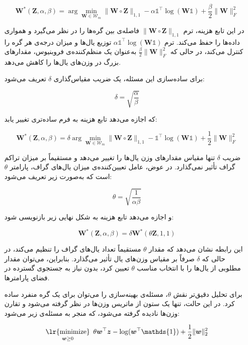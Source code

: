 \documentclass[10pt,twocolumn,a4paper]{article}
\newcommand\minimize[1]{\mathop{\text{\lr{minimize}}}\limits_{#1}\ }
\begin{document}
      \[
      \bm{W}^*(\bm{Z}, \alpha, \beta) = \arg \min_{\bm{W} \in \mathcal{W}_m} \|\bm{W} \circ \bm{Z}\|_{1,1} - \alpha \mathds{1}^\top \log(\bm{W} \mathds{1}) + \frac{\beta}{2} \|\bm{W}\|_F^2
      \]
      
      در این تابع هزینه، ترم \( \|\bm{W} \circ \bm{Z}\|_{1,1} \) فاصله‌ی بین گره‌ها را در نظر می‌گیرد و همواری داده‌ها را حفظ می‌کند. ترم \( \alpha \mathds{1}^\top \log(\bm{W} \mathds{1}) \) توزیع یال‌ها و میزان درجه‌ی هر گره را کنترل می‌کند، در حالی که \( \frac{\beta}{2} \|\bm{W}\|_F^2 \) به‌عنوان یک منظم‌کننده‌ی فروبنیوس، مقدارهای بزرگ در وزن‌های یال‌ها را کاهش می‌دهد.
      
      برای ساده‌سازی این مسئله، یک ضریب مقیاس‌گذاری \( \delta \) تعریف می‌شود:
      
      \[
      \delta = \sqrt{\frac{\alpha}{\beta}}
      \]
      
      که اجازه می‌دهد تابع هزینه به فرم ساده‌تری تغییر یابد:
      
      \[
      \bm{W}^*(\bm{Z}, \alpha, \beta) = \delta \arg \min_{\bm{W} \in \mathcal{W}_m} \|\bm{W} \circ \bm{Z}\|_{1,1} - \mathds{1}^\top \log(\bm{W} \mathds{1}) + \frac{1}{2} \|\bm{W}\|_F^2
      \]
      
      ضریب \( \delta \) تنها مقیاس مقدارهای وزن یال‌ها را تغییر می‌دهد و مستقیماً بر میزان تراکم گراف تأثیر نمی‌گذارد. در عوض، عامل تعیین‌کننده‌ی میزان یال‌های گراف، پارامتر \( \theta \) است که به‌صورت زیر تعریف می‌شود:
      
      \[
      \theta = \sqrt{\frac{1}{\alpha \beta}}
      \]
      
      و اجازه می‌دهد تابع هزینه به شکل نهایی زیر بازنویسی شود:
      
      \[
      \bm{W}^*(\bm{Z}, \alpha, \beta) = \delta \bm{W}^*(\theta \bm{Z}, 1, 1)
      \]
      
      این رابطه نشان می‌دهد که مقدار \( \theta \) مستقیماً تعداد یال‌های گراف را تنظیم می‌کند، در حالی که \( \delta \) صرفاً بر مقیاس وزن‌های یال تأثیر می‌گذارد. بنابراین، می‌توان مقدار مطلوبی از یال‌ها را با انتخاب مناسب \( \theta \) تعیین کرد، بدون نیاز به جستجوی گسترده در فضای پارامترها.
      
      برای تحلیل دقیق‌تر نقش \( \theta \)، مسئله‌ی بهینه‌سازی را می‌توان برای یک گره منفرد ساده کرد. در این حالت، تنها یک ستون از ماتریس وزن‌ها در نظر گرفته می‌شود و تقارن وزن‌ها نادیده گرفته می‌شود، که منجر به مسئله‌ی زیر می‌شود:
      
      \[
      \minimize{\bm{w} \geq 0} \theta \bm{w}^\top \bm{z} - \log(\bm{w}^\top \mathds{1}) + \frac{1}{2} \|\bm{w}\|_2^2
      \]
      
\end{document}
